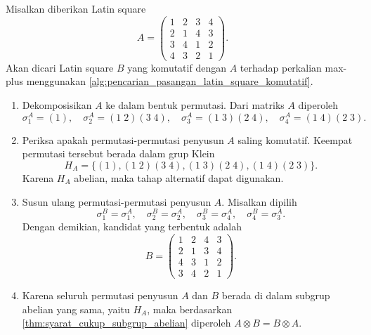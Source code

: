 \begin{contoh}\label{contoh:penerapan_algoritma_ordo_4_alternatif}
  Misalkan diberikan Latin square
  \[
    A=
    \begin{pmatrix}
      1 & 2 & 3 & 4 \\
      2 & 1 & 4 & 3 \\
      3 & 4 & 1 & 2 \\
      4 & 3 & 2 & 1
    \end{pmatrix}.
  \]
  Akan dicari Latin square $B$ yang komutatif dengan $A$ terhadap perkalian
  max-plus menggunakan \autoref{alg:pencarian_pasangan_latin_square_komutatif}.

  \begin{enumerate}
    \item Dekomposisikan $A$ ke dalam bentuk permutasi. Dari matriks $A$
          diperoleh
          \[
            \sigma_1^A=(1),\quad
            \sigma_2^A=(1\;2)(3\;4),\quad
            \sigma_3^A=(1\;3)(2\;4),\quad
            \sigma_4^A=(1\;4)(2\;3).
          \]

    \item Periksa apakah permutasi-permutasi penyusun $A$ saling komutatif.
          Keempat permutasi tersebut berada dalam grup Klein
          \[
            H_A=
            \{(1),(1\;2)(3\;4),(1\;3)(2\;4),(1\;4)(2\;3)\}.
          \]
          Karena $H_A$ abelian, maka tahap alternatif dapat digunakan.

    \item Susun ulang permutasi-permutasi penyusun $A$. Misalkan dipilih
          \[
            \sigma_1^B=\sigma_1^A,\quad
            \sigma_2^B=\sigma_2^A,\quad
            \sigma_3^B=\sigma_4^A,\quad
            \sigma_4^B=\sigma_3^A.
          \]
          Dengan demikian, kandidat yang terbentuk adalah
          \[
            B=
            \begin{pmatrix}
              1 & 2 & 4 & 3 \\
              2 & 1 & 3 & 4 \\
              4 & 3 & 1 & 2 \\
              3 & 4 & 2 & 1
            \end{pmatrix}.
          \]

    \item Karena seluruh permutasi penyusun $A$ dan $B$ berada di dalam
          subgrup abelian yang sama, yaitu $H_A$, maka berdasarkan
          \autoref{thm:syarat_cukup_subgrup_abelian} diperoleh
          $A\otimes B=B\otimes A$.


\end{enumerate}
\end{contoh}
